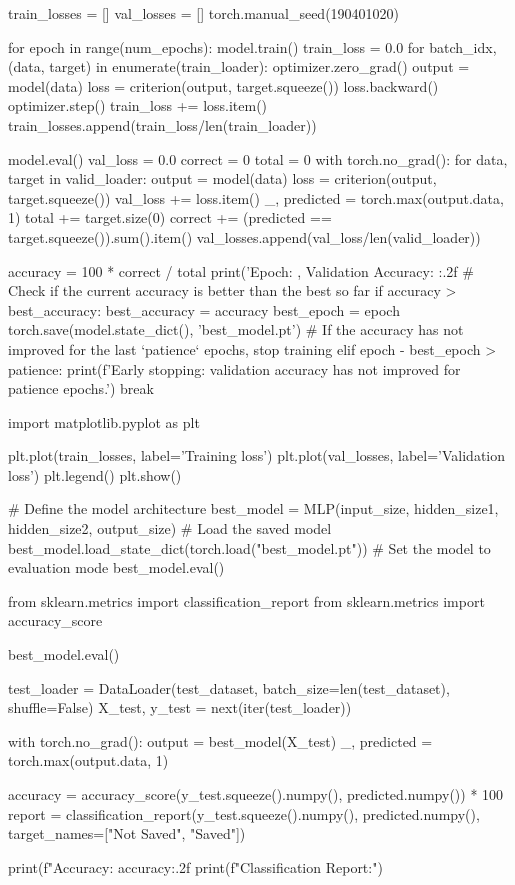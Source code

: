 \documentclass[11pt]{article}
\begin{document}
\begin{python}
train_losses = []
val_losses = []
torch.manual_seed(190401020)

for epoch in range(num_epochs):
    model.train()
    train_loss = 0.0
    for batch_idx, (data, target) in enumerate(train_loader):
        optimizer.zero_grad()
        output = model(data)
        loss = criterion(output, target.squeeze())
        loss.backward()
        optimizer.step()
        train_loss += loss.item()
    train_losses.append(train_loss/len(train_loader))

    model.eval()
    val_loss = 0.0
    correct = 0
    total = 0
    with torch.no_grad():
        for data, target in valid_loader:
            output = model(data)
            loss = criterion(output, target.squeeze())
            val_loss += loss.item()
            _, predicted = torch.max(output.data, 1)
            total += target.size(0)
            correct += (predicted == target.squeeze()).sum().item()
        val_losses.append(val_loss/len(valid_loader))
    
    accuracy = 100 * correct / total
    print('Epoch: {}, Validation Accuracy: {:.2f}%
 # Check if the current accuracy is better than the best so far
    if accuracy > best_accuracy:
        best_accuracy = accuracy
        best_epoch = epoch
        torch.save(model.state_dict(), 'best_model.pt')
    # If the accuracy has not improved for the last `patience` epochs, stop training
    elif epoch - best_epoch > patience:
        print(f'Early stopping: validation accuracy has not improved for {patience} epochs.')
        break

import matplotlib.pyplot as plt

plt.plot(train_losses, label='Training loss')
plt.plot(val_losses, label='Validation loss')
plt.legend()
plt.show()

# Define the model architecture
best_model = MLP(input_size, hidden_size1, hidden_size2, output_size)
# Load the saved model
best_model.load_state_dict(torch.load("best_model.pt"))
# Set the model to evaluation mode
best_model.eval()

from sklearn.metrics import classification_report
from sklearn.metrics import accuracy_score

best_model.eval()

test_loader = DataLoader(test_dataset, batch_size=len(test_dataset), shuffle=False)
X_test, y_test = next(iter(test_loader))

with torch.no_grad():
    output = best_model(X_test)
    _, predicted = torch.max(output.data, 1)

accuracy = accuracy_score(y_test.squeeze().numpy(), predicted.numpy()) * 100
report = classification_report(y_test.squeeze().numpy(), predicted.numpy(), target_names=["Not Saved", "Saved"])

print(f"Accuracy: {accuracy:.2f}%
print(f"Classification Report:")
\end{python}
\end{document}
